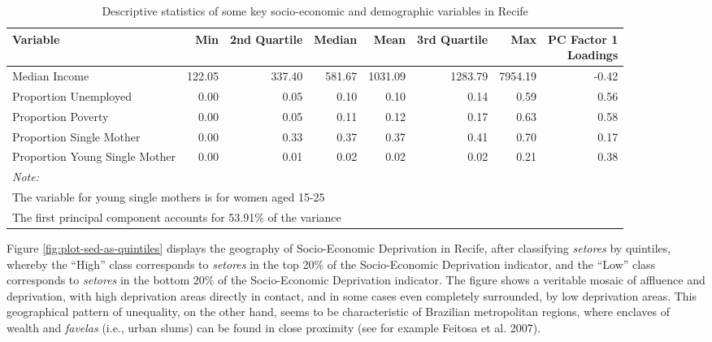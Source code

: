 \documentclass[smallextended]{svjour3}       %
\begin{document}
\begin{table}

\caption{\label{tab:table-sed-descriptive-statistics}\label{tab:sed-descriptive-statistics}Descriptive statistics of some key socio-economic and demographic variables in Recife}
\centering
\begin{tabular}[t]{lrrrrrrr}
\toprule
Variable & Min & 2nd Quartile & Median & Mean & 3rd Quartile & Max & \makecell[l]{PC Factor 1\\ Loadings}\\
\midrule
Median Income & 122.05 & 337.40 & 581.67 & 1031.09 & 1283.79 & 7954.19 & -0.42\\
Proportion Unemployed & 0.00 & 0.05 & 0.10 & 0.10 & 0.14 & 0.59 & 0.56\\
Proportion Poverty & 0.00 & 0.05 & 0.11 & 0.12 & 0.17 & 0.63 & 0.58\\
Proportion Single Mother & 0.00 & 0.33 & 0.37 & 0.37 & 0.41 & 0.70 & 0.17\\
Proportion Young Single Mother & 0.00 & 0.01 & 0.02 & 0.02 & 0.02 & 0.21 & 0.38\\
\bottomrule
\multicolumn{8}{l}{\textit{Note: }}\\
\multicolumn{8}{l}{The variable for young single mothers is for women aged 15-25}\\
\multicolumn{8}{l}{The first principal component accounts for 53.91\% of the variance}\\
\end{tabular}
\end{table}

Figure \ref{fig:plot-sed-as-quintiles} displays the geography of
Socio-Economic Deprivation in Recife, after classifying \emph{setores}
by quintiles, whereby the ``High'' class corresponds to \emph{setores}
in the top 20\% of the Socio-Economic Deprivation indicator, and the
``Low'' class corresponds to \emph{setores} in the bottom 20\% of the
Socio-Economic Deprivation indicator. The figure shows a veritable
mosaic of affluence and deprivation, with high deprivation areas
directly in contact, and in some cases even completely surrounded, by
low deprivation areas. This geographical pattern of unequality, on the
other hand, seems to be characteristic of Brazilian metropolitan
regions, where enclaves of wealth and \emph{favelas} (i.e., urban slums)
can be found in close proximity (see for example Feitosa et al. 2007).
\end{document}
